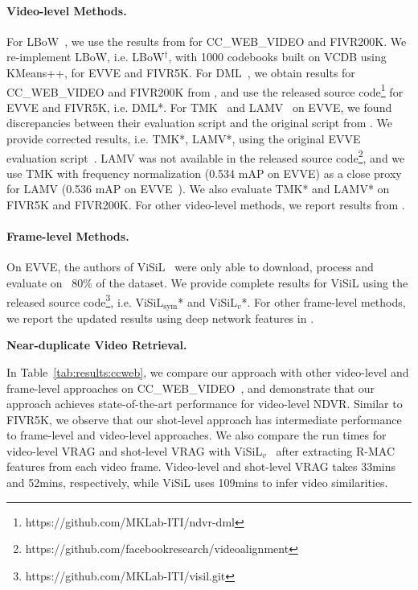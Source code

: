 \documentclass[letterpaper]{article} \usepackage{aaai22}  \usepackage{times}  \usepackage{helvet}  \usepackage{courier}  \usepackage[hyphens]{url}  \usepackage{graphicx} \urlstyle{rm} \usepackage{amsmath}
\begin{document}
\paragraph{Video-level Methods.} For LBoW~\cite{lbow}, we use the results from \cite{video-verification-fake-news} for CC\_WEB\_VIDEO and FIVR200K. We re-implement LBoW, i.e. LBoW$^\dagger$, with 1000 codebooks built on  VCDB using KMeans++, for EVVE and FIVR5K. For DML~\cite{kordopatis2017dml}, we obtain results for CC\_WEB\_VIDEO and FIVR200K from \cite{video-verification-fake-news}, and use the released source code\footnote{https://github.com/MKLab-ITI/ndvr-dml} for EVVE and FIVR5K, i.e. DML*. 
For TMK~\cite{baseline:tmk} and LAMV~\cite{Baraldi2018LAMVLT} on EVVE, we found discrepancies between their evaluation script and the original script from \cite{dataset:evve}. We provide corrected results, i.e. TMK*, LAMV*, using the original EVVE evaluation script~\cite{dataset:evve}. LAMV was not available in the released source code\footnote{\label{footnote:lamv}https://github.com/facebookresearch/videoalignment}, and we use TMK with frequency normalization (0.534 mAP on EVVE) as a close proxy for LAMV (0.536 mAP on EVVE~\cite{Baraldi2018LAMVLT}). We also evaluate TMK* and LAMV* on FIVR5K and FIVR200K. For other video-level methods, we report results from \cite{kordopatiszilos2019visil}.

\vspace{-3mm}
\paragraph{Frame-level Methods.} On EVVE, the authors of ViSiL~\cite{kordopatiszilos2019visil} were only able to download, process and evaluate on ~80\% of the dataset. We provide complete results for ViSiL using the released source code\footnote{https://github.com/MKLab-ITI/visil.git}, i.e. ViSiL$_\text{sym}$* and ViSiL$_{v}$*. For other frame-level methods, we report the updated results using deep network features in \cite{kordopatiszilos2019visil}.

\textbf{Near-duplicate Video Retrieval.}

In Table~\ref{tab:results:ccweb}, we compare our approach with other video-level and frame-level approaches on CC\_WEB\_VIDEO~\cite{dataset:cc-web-video}, and demonstrate that our approach achieves state-of-the-art performance for video-level NDVR. Similar to FIVR5K, we observe that our shot-level approach has intermediate performance to frame-level and video-level approaches. 
We also compare the run times for video-level VRAG and shot-level VRAG with ViSiL$_v$~\cite{kordopatiszilos2019visil} after extracting R-MAC features from each video frame. Video-level and shot-level VRAG takes 33mins and 52mins, respectively, while ViSiL uses 109mins to infer video similarities. 
\end{document}
